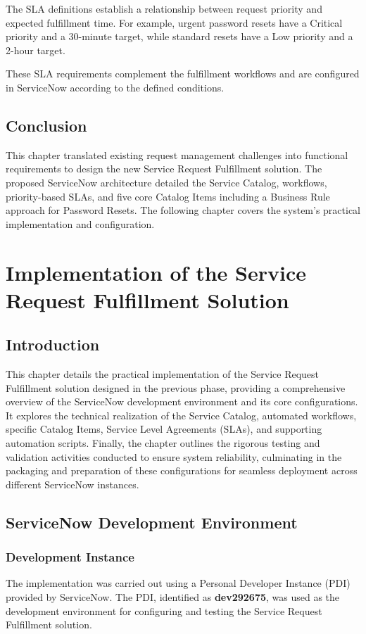 \documentclass[12pt,a4paper]{report}
\begin{document}
The SLA definitions establish a relationship between request priority and
expected fulfillment time. For example, urgent password resets have a
Critical priority and a 30-minute target, while standard resets have a Low
priority and a 2-hour target.

These SLA requirements complement the fulfillment workflows and are
configured in ServiceNow according to the defined conditions.

\section{Conclusion}
This chapter translated existing request management challenges into functional requirements 
to design the new Service Request Fulfillment solution. The proposed ServiceNow architecture detailed the Service 
Catalog, workflows, priority-based SLAs, and five core Catalog Items including a Business Rule approach for 
Password Resets. The following chapter covers the system's practical implementation and configuration.

\chapter{Implementation of the Service Request Fulfillment Solution}

\section{Introduction}
This chapter details the practical implementation of the Service Request Fulfillment solution designed in 
the previous phase, providing a comprehensive overview of the ServiceNow development environment and 
its core configurations. It explores the technical realization of the Service Catalog, automated workflows, 
specific Catalog Items, Service Level Agreements (SLAs), and supporting automation scripts. 
Finally, the chapter outlines the rigorous testing and validation activities conducted to ensure system 
reliability, culminating in the packaging and preparation of these configurations for seamless 
deployment across different ServiceNow instances.

\section{ServiceNow Development Environment}

\subsection{Development Instance}
The implementation was carried out using a Personal Developer Instance (PDI)
provided by ServiceNow. The PDI, identified as \textbf{dev292675}, was used as
the development environment for configuring and testing the Service Request
Fulfillment solution.
\end{document}
